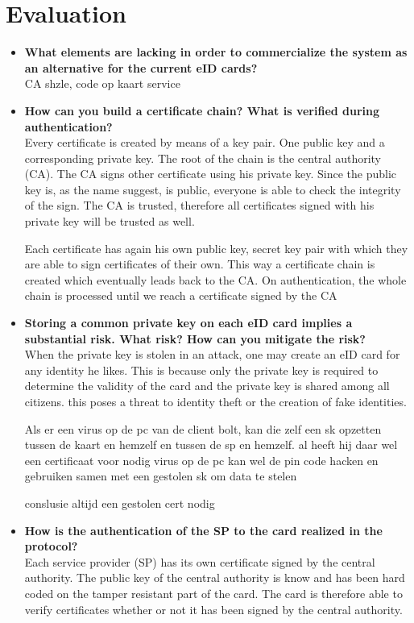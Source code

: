 \documentclass[12pt]{report}
\begin{document}
\section{Evaluation}
\begin{itemize}
\item \textbf{What elements are lacking in order to commercialize the system as an alternative for the current eID cards?}\\ 
CA shzle, code op kaart service

\item \textbf{How can you build a certificate chain? What is verified during authentication?}\\
Every certificate is created by means of a key pair. One public key and a corresponding private key. The root of the chain is the central authority (CA). The CA signs other certificate using his private key. Since the public key is, as the name suggest, is public, everyone is able to check the integrity of the sign. The CA is trusted, therefore all certificates signed with his private key will be trusted as well.

Each certificate has again his own public key, secret key pair with which they are able to sign certificates of their own. This way a certificate chain is created which eventually leads back to the CA. On authentication, the whole chain is processed until we reach a certificate signed by the CA

\item \textbf{Storing a common private key on each eID card implies a substantial risk. What risk? How can you mitigate the risk?}\\
When the private key is stolen in an attack, one may create an eID card for any identity he likes. This is because only the private key is required to determine the validity of the card and the private key is shared among all citizens. this poses a threat to identity theft or the creation of fake identities.

Als er een virus op de pc van de client bolt, kan die zelf een sk opzetten tussen de kaart en hemzelf en tussen de sp en hemzelf. al heeft hij daar wel een certificaat voor nodig 
virus op de pc kan wel de pin code hacken en gebruiken samen met een gestolen sk om data te stelen

conslusie altijd een gestolen cert nodig

\item \textbf{How is the authentication of the SP to the card realized in the protocol?}\\
Each service provider (SP) has its own certificate signed by the central authority. The public key of the central authority is know and has been hard coded on the tamper resistant part of the card. The card is therefore able to verify certificates whether or not it has been signed by the central authority. 


\end{itemize}
\end{document}
